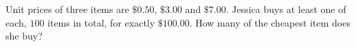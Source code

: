 Unit prices of three items are $\$0.50$, $\$3.00$ and $\$7.00$. Jessica buys at least one of each, $100$ items in total, for exactly $\$100.00$. How many of the cheapest item does she buy?
